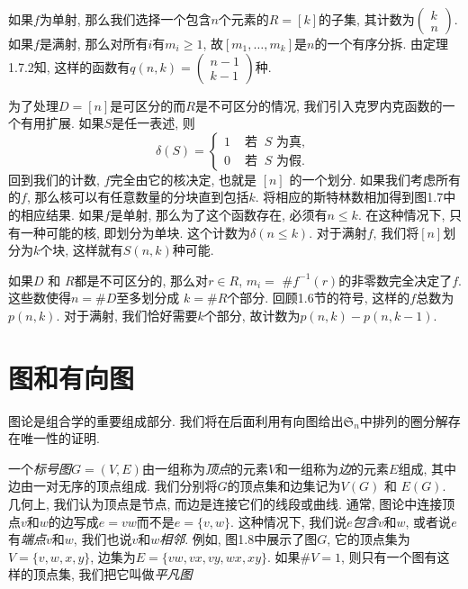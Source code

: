 \documentclass{ctexbook}
\begin{document}
\noindent
如果$f$为单射, 那么我们选择一个包含$n$个元素的$R=[k]$的子集, 其计数为$\left(\begin{array}{l}k \\ n\end{array}\right)$.
如果$f$是满射, 那么对所有$i$有$m_{i} \geqslant 1$, 故$\left[m_{1}, \ldots, m_{k}\right]$是$n$的一个有序分拆.
由定理1.7.2知, 这样的函数有$q(n, k)=\left(\begin{array}{c}n-1 \\ k-1\end{array}\right)$种.

为了处理$D=[n]$是可区分的而$R$是不可区分的情况, 我们引入克罗内克函数的一个有用扩展. 如果$S$是任一表述, 则
\begin{equation}
    \delta(S)=\left\{\begin{array}{ll}
        1 & \text { 若 }\  S \text{ 为真, } \\
        0 & \text { 若 } \ S \text{ 为假. }
        \end{array}\right.
\end{equation}
回到我们的计数, $f$完全由它的核决定, 也就是  $[n]$ 的一个划分. 如果我们考虑所有的$f$, 那么核可以有任意数量的分块直到包括$k$.
将相应的斯特林数相加得到图1.7中的相应结果. 如果$f$是单射, 那么为了这个函数存在, 必须有$n \leqslant k$. 在这种情况下,
只有一种可能的核, 即划分为单块. 这个计数为$\delta(n \leqslant k)$. 对于满射$f$, 我们将$[n]$划分为$k$个块, 这样就有$S(n, k)$种可能.

如果$D$ 和 $R$都是不可区分的, 那么对$r \in R$, $m_{i}=$ $\# f^{-1}(r)$的非零数完全决定了$f$. 这些数使得$n=\# D$至多划分成
$k=\# R$个部分. 回顾1.6节的符号, 这样的$f$总数为$p(n, k)$. 对于满射, 我们恰好需要$k$个部分, 故计数为$p(n, k)-p(n, k-1)$.

\section{图和有向图}
图论是组合学的重要组成部分. 我们将在后面利用有向图给出$\mathfrak{S}_{n}$中排列的圈分解存在唯一性的证明.

一个\textsl{标号图}$G=(V, E)$由一组称为\textsl{顶点}的元素$V$和一组称为\textsl{边}的元素$E$组成, 其中边由一对无序的顶点组成.
我们分别将$G$的顶点集和边集记为$V(G)$ 和 $E(G)$. 几何上, 我们认为顶点是节点, 而边是连接它们的线段或曲线.
通常, 图论中连接顶点$v$和$w$的边写成$e=v w$而不是$e=\{ v, w \}$. 这种情况下, 我们说$e$\textsl{包含}$v$和$w$,
或者说$e$有\textsl{端点}$v$和$w$, 我们也说$v$和$w$\textsl{相邻}. 例如, 图1.8中展示了图$G$, 它的顶点集为$V=\{v, w, x, y\}$,
边集为$E=\{v w, v x, v y, w x, x y\}$. 如果$\# V=1$, 则只有一个图有这样的顶点集, 我们把它叫做\textsl{平凡图}
\end{document}
